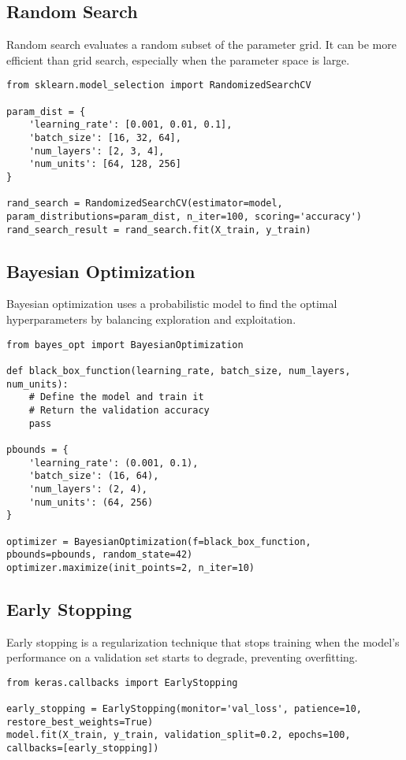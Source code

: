 \subsection{Random Search}
Random search evaluates a random subset of the parameter grid. It can be more efficient than grid search, especially when the parameter space is large.

\begin{verbatim}
from sklearn.model_selection import RandomizedSearchCV

param_dist = {
    'learning_rate': [0.001, 0.01, 0.1],
    'batch_size': [16, 32, 64],
    'num_layers': [2, 3, 4],
    'num_units': [64, 128, 256]
}

rand_search = RandomizedSearchCV(estimator=model, param_distributions=param_dist, n_iter=100, scoring='accuracy')
rand_search_result = rand_search.fit(X_train, y_train)
\end{verbatim}

\subsection{Bayesian Optimization}
Bayesian optimization uses a probabilistic model to find the optimal hyperparameters by balancing exploration and exploitation.

\begin{verbatim}
from bayes_opt import BayesianOptimization

def black_box_function(learning_rate, batch_size, num_layers, num_units):
    # Define the model and train it
    # Return the validation accuracy
    pass

pbounds = {
    'learning_rate': (0.001, 0.1),
    'batch_size': (16, 64),
    'num_layers': (2, 4),
    'num_units': (64, 256)
}

optimizer = BayesianOptimization(f=black_box_function, pbounds=pbounds, random_state=42)
optimizer.maximize(init_points=2, n_iter=10)
\end{verbatim}

\subsection{Early Stopping}
Early stopping is a regularization technique that stops training when the model's performance on a validation set starts to degrade, preventing overfitting.

\begin{verbatim}
from keras.callbacks import EarlyStopping

early_stopping = EarlyStopping(monitor='val_loss', patience=10, restore_best_weights=True)
model.fit(X_train, y_train, validation_split=0.2, epochs=100, callbacks=[early_stopping])
\end{verbatim}


